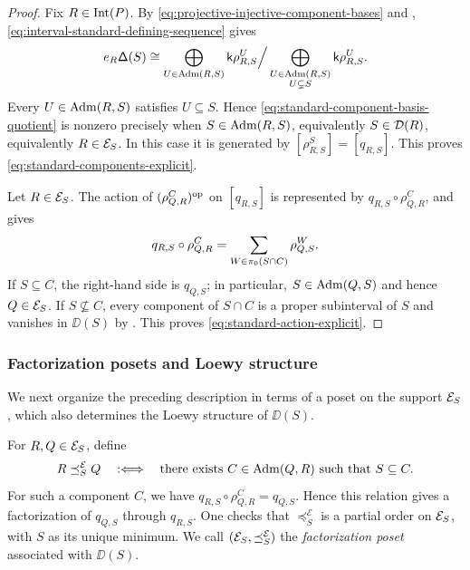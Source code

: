 \begin{proof}
Fix $R\in\operatorname{Int}(P)$. By
\eqref{eq:projective-injective-component-bases} and
,
\eqref{eq:interval-standard-defining-sequence} gives
\begin{equation}
e_R\mathsf\Delta(S)
\cong
\bigoplus_{U\in\operatorname{Adm}(R,S)}\mathsf{k}\rho_{R,S}^{U}
\Big/
\bigoplus_{\substack{U\in\operatorname{Adm}(R,S)\\ U\subsetneq S}}
\mathsf{k}\rho_{R,S}^{U}.
\label{eq:standard-component-basis-quotient}
\end{equation}
Every $U\in\operatorname{Adm}(R,S)$ satisfies $U\subseteq S$. Hence
\eqref{eq:standard-component-basis-quotient} is nonzero precisely when
$S\in\operatorname{Adm}(R,S)$, equivalently $S\in\mathcal D(R)$, equivalently $R\in\mathcal E_S$. 
In this case it is generated by
$[\rho_{R,S}^{S}]=[q_{R,S}]$.
This proves \eqref{eq:standard-components-explicit}.

Let $R\in\mathcal E_S$.  The action of $(\rho_{Q,R}^{C})^{\mathrm{op}}$ on
$[q_{R,S}]$ is represented by $q_{R,S}\circ\rho_{Q,R}^{C}$, and
 gives
\begin{equation}
q_{R,S}\circ\rho_{Q,R}^{C}
=
\sum_{W\in\pi_0(S\cap C)}\rho_{Q,S}^{W}.
\label{eq:standard-action-before-quotient}
\end{equation}
If $S\subseteq C$, the right-hand side is $q_{Q,S}$; in particular,
$S\in\operatorname{Adm}(Q,S)$ and hence $Q\in\mathcal E_S$.  If $S\nsubseteq C$, every
component of $S\cap C$ is a proper subinterval of $S$ and vanishes in
$\DD(S)$ by .  This proves
\eqref{eq:standard-action-explicit}.
\end{proof}



\subsubsection{Factorization posets and Loewy structure}
\label{sec:standard-factorization-posets}

We next organize the preceding description in terms of a poset on the support $\mathcal E_S$, which also determines the Loewy structure of $\DD(S)$.

For $R,Q\in\mathcal E_S$, define
\begin{equation}
\label{eq:standard-factorization-order}
R\preceq_S^{\mathcal E}Q
\quad:\Longleftrightarrow\quad
\text{there exists } C\in\operatorname{Adm}(Q,R)
\text{ such that } S\subseteq C.
\end{equation}
For such a component $C$, we have 
$q_{R,S}\circ\rho_{Q,R}^{C}=
q_{Q,S}$.
Hence this relation gives a factorization of $q_{Q,S}$ through $q_{R,S}$.
One checks that $\preceq_S^{\mathcal E}$ is a partial order on
$\mathcal E_S$, with $S$ as its unique minimum.
We call $(\mathcal E_S,\preceq_S^{\mathcal E})$ the
\emph{factorization poset} associated with $\DD(S)$.


